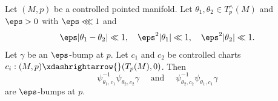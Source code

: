 \begin{lemma}\label{lem:standard2:bumps-modulated-become-bumps}
  Let $(M, p)$ be a controlled pointed manifold.  Let $\theta_1, \theta_2 \in T_p^\wedge(M)$ and $\eps > 0$ with $\eps \lll 1$ and
  \begin{equation}\label{eq:epsth-thet-ll}
    \eps |\theta_1 - \theta_2| \ll 1, \quad
    \eps^2 |\theta_1| \ll 1,
    \quad
    \eps^2 |\theta_2| \ll 1.
  \end{equation}
  Let $\gamma$ be an $\eps$-bump at $p$.  Let $c_1$ and $c_2$ be controlled charts $c_i : (M,p) \xdashrightarrow{} (T_p(M), 0)$.  Then
  \begin{equation}\label{eq:psi_theta_1-c_1-1}
    \psi_{\theta_1,c_1}^{-1} \psi_{\theta_2, c_2} \gamma
    \quad
    \text{ and }
    \quad
    \psi_{\theta_2,c_2}^{-1} \psi_{\theta_1, c_1} \gamma
  \end{equation}
  are $\eps$-bumps at $p$.
\end{lemma}
